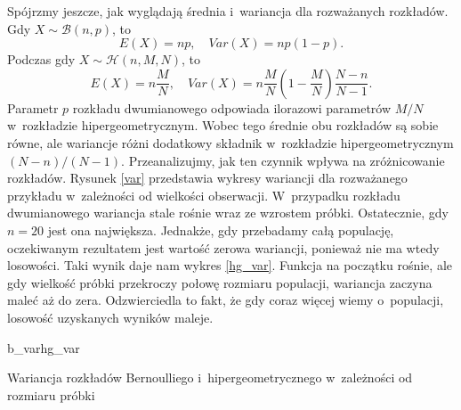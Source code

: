 Spójrzmy jeszcze, jak wyglądają średnia i~wariancja dla rozważanych rozkładów. \newline
Gdy $X\sim\mathcal{B}(n,p)$, to
\begin{equation}
E(X)=np,\quad Var(X)=np(1-p).
\end{equation}
Podczas gdy $X\sim\mathcal{H}(n,M,N)$, to
\begin{equation}
E(X)=n\frac{M}{N},\quad Var(X)=n\frac{M}{N}\left(1-\frac{M}{N}\right)\frac{N-n}{N-1}.
\end{equation}
Parametr $p$ rozkładu dwumianowego odpowiada ilorazowi parametrów $M/N$ w~rozkładzie hipergeometrycznym. Wobec tego średnie obu rozkładów są sobie równe, ale wariancje różni dodatkowy składnik w~rozkładzie hipergeometrycznym $(N-n)/(N-1)$. Przeanalizujmy, jak ten czynnik wpływa na zróżnicowanie rozkładów. Rysunek \ref{var} przedstawia wykresy wariancji dla rozważanego przykładu w~zależności od wielkości obserwacji. W~przypadku rozkładu dwumianowego wariancja stale rośnie wraz ze wzrostem próbki. Ostatecznie, gdy $n=20$ jest ona największa. Jednakże, gdy przebadamy całą populację, oczekiwanym rezultatem jest wartość zerowa wariancji, ponieważ nie ma wtedy losowości. Taki wynik daje nam wykres \ref{hg_var}. Funkcja na początku rośnie, ale gdy wielkość próbki przekroczy połowę rozmiaru populacji, wariancja zaczyna maleć aż do zera. Odzwierciedla to fakt, że gdy coraz więcej wiemy o~populacji, losowość uzyskanych wyników maleje.

\begin{diagrams}{b_var}{hg_var}
	\caption{Wariancja rozkładów Bernoulliego i~hipergeometrycznego w~zależności od rozmiaru próbki}
	\label{var}
\end{diagrams}